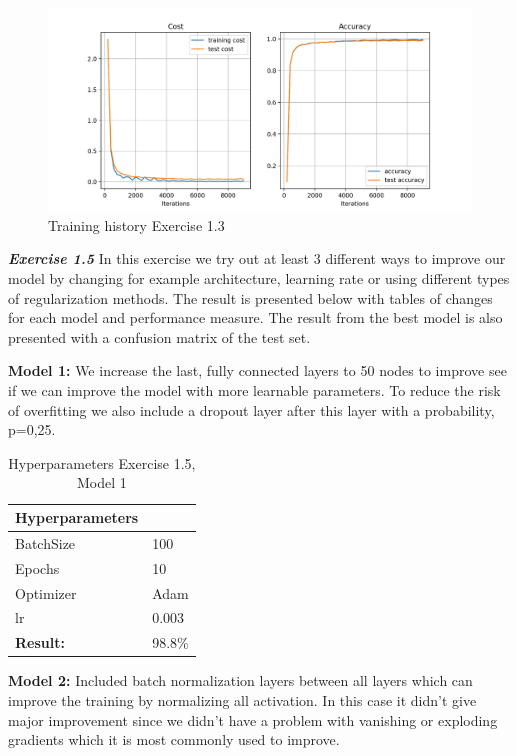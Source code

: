 \documentclass[a4paper,10pt]{article}
\begin{document}
\newpage

\begin{figure}[ht!]
\centering
\includegraphics[width=120mm]{figures/assignment_3/convnet_adam.png}
\caption{Training history Exercise 1.3}
\label{fig:convnetadam}
\end{figure}


\textit{\textbf{Exercise 1.5}} In this exercise we try out at least 3 different ways to improve our model by changing for example architecture, learning rate or using different types of regularization methods. The result is presented below with tables of changes for each model and performance measure. The result from the best model is also presented with a confusion matrix of the test set. 

\textbf{Model 1:} We increase the last, fully connected layers to 50 nodes to improve see if we can improve the model with more learnable parameters. To reduce the risk of overfitting we also include a dropout layer after this layer with a probability, p=0,25. 
\begin{table}[ht!]
\centering
\begin{tabular}{ll}\hline
 \textbf{Hyperparameters}&    \\ \hline
 BatchSize&  100  \\
 Epochs&  10 \\ 
 Optimizer& Adam  \\
 lr& 0.003 \\ \hline
\textbf{Result: }&   98.8\% \\ \hline
\end{tabular}
\caption{Hyperparameters Exercise 1.5, Model 1}
\label{tab:tab7}
\end{table}

\textbf{Model 2:} Included batch normalization layers between all layers which can improve the training by normalizing all activation. In this case it didn't give major improvement since we didn't have a problem with vanishing or exploding gradients which it is most commonly used to improve. 
\end{document}
